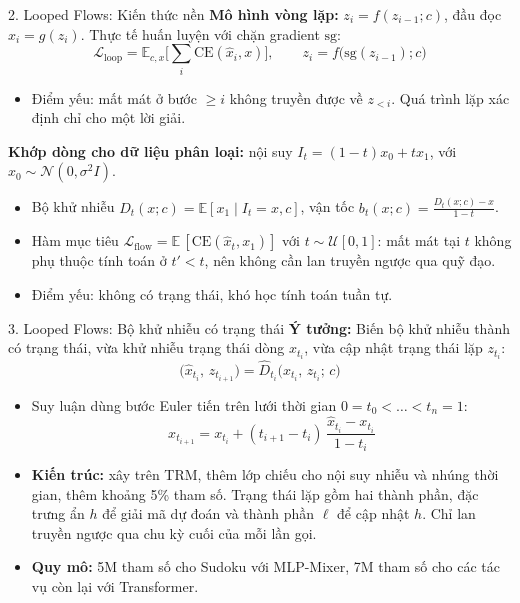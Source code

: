 \begin{frame}{2. Looped Flows: Kiến thức nền}
    \textbf{Mô hình vòng lặp:} $z_i = f(z_{i-1}; c)$, đầu đọc $\hat{x}_i = g(z_i)$. Thực tế huấn luyện với chặn gradient $\mathrm{sg}$:
    $$\mathcal{L}_{\text{loop}} = \mathbb{E}_{c,x}\Big[\sum_i \mathrm{CE}(\hat{x}_i, x)\Big], \qquad z_i = f\big(\mathrm{sg}(z_{i-1}); c\big)$$
    \begin{itemize}
        \item Điểm yếu: mất mát ở bước $\ge i$ không truyền được về $z_{<i}$. Quá trình lặp xác định chỉ cho một lời giải.
    \end{itemize}
    \vspace{0.1cm}
    \textbf{Khớp dòng cho dữ liệu phân loại:} nội suy $I_t = (1-t)x_0 + t x_1$, với $x_0 \sim \mathcal{N}(0,\sigma^2 I)$.
    \begin{itemize}
        \item Bộ khử nhiễu $D_t(x;c) = \mathbb{E}[x_1 \mid I_t = x, c]$, vận tốc $b_t(x;c) = \frac{D_t(x;c) - x}{1-t}$.
        \item Hàm mục tiêu $\mathcal{L}_{\text{flow}} = \mathbb{E}\,[\mathrm{CE}(\hat{x}_t, x_1)]$ với $t \sim \mathcal{U}[0,1]$: mất mát tại $t$ không phụ thuộc tính toán ở $t' < t$, nên không cần lan truyền ngược qua quỹ đạo.
        \item Điểm yếu: không có trạng thái, khó học tính toán tuần tự.
    \end{itemize}
\end{frame}

\begin{frame}{3. Looped Flows: Bộ khử nhiễu có trạng thái}
    \textbf{Ý tưởng:} Biến bộ khử nhiễu thành có trạng thái, vừa khử nhiễu trạng thái dòng $x_{t_i}$, vừa cập nhật trạng thái lặp $z_{t_i}$:
    $$\big(\hat{x}_{t_i},\, z_{t_{i+1}}\big) = \hat{D}_{t_i}\big(x_{t_i},\, z_{t_i};\, c\big)$$
    \begin{itemize}
        \item Suy luận dùng bước Euler tiến trên lưới thời gian $0 = t_0 < \dots < t_n = 1$:
        $$x_{t_{i+1}} = x_{t_i} + (t_{i+1} - t_i)\,\frac{\hat{x}_{t_i} - x_{t_i}}{1 - t_i}$$
        \item \textbf{Kiến trúc:} xây trên TRM, thêm lớp chiếu cho nội suy nhiễu và nhúng thời gian, thêm khoảng 5\% tham số. Trạng thái lặp gồm hai thành phần, đặc trưng ẩn $h$ để giải mã dự đoán và thành phần $\ell$ để cập nhật $h$. Chỉ lan truyền ngược qua chu kỳ cuối của mỗi lần gọi.
        \item \textbf{Quy mô:} 5M tham số cho Sudoku với MLP-Mixer, 7M tham số cho các tác vụ còn lại với Transformer.
    \end{itemize}
\end{frame}

